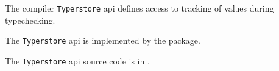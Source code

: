 
The compiler {\tt Typerstore} api defines access to tracking of 
values during typechecking.

The {\tt Typerstore} api is implemented by the  package.

The {\tt Typerstore} api source code is in .

